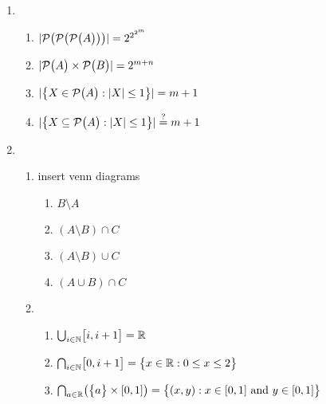 \begin{enumerate}
    \item 
    \begin{enumerate}[label=(\alph*), itemsep=10pt]
        \item $\lvert {\mathcal{P}\bigl( {\mathcal{P}\bigl( {\mathcal{P}\bigl( {A} \bigr)} \bigr)} \bigr)} \rvert = 2^{2^{2^m}}$
        \item $\lvert {\mathcal{P}\bigl( {A} \bigr)\times\mathcal{P}\bigl( {B} \bigr)} \rvert = 2^{m + n}$
        \item $\lvert {\bigl\{ {X \in \mathcal{P}\bigl( {A} \bigr) : \lvert {X} \rvert \leq 1} \bigr\}} \rvert = m + 1$
        \item $\lvert {\bigl\{ {X \subseteq \mathcal{P}\bigl( {A} \bigr) : \lvert {X} \rvert \leq 1} \bigr\}} \rvert \stackrel{?}{=} m + 1$ 
    \end{enumerate}

    \item
    \begin{enumerate}[label=(\alph*), itemsep=16pt]
        \item insert venn diagrams
        \begin{enumerate}[label=(\roman*), itemsep=10pt]
            \item $B \setminus A$
            \item $(A \setminus B) \cap C$
            \item $(A \setminus B) \cup C$
            \item $(A \cup B) \cap C$
        \end{enumerate}

        \item 
        \begin{enumerate}[label=(\roman*), itemsep=10pt]
            \item $\bigcup_{i \in \operatorname{\mathbb{N}}} \bigl[i,i+1\bigr] = \operatorname{\mathbb{R}}$
            \item $\bigcap_{i \in \operatorname{\mathbb{N}}} \bigl[0,i+1\bigr] = \bigl\{ { x \in \operatorname{\mathbb{R}} : 0 \le x \le 2 } \bigr\}$
            \item $\bigcap_{a \in \operatorname{\mathbb{R}}} \bigl(\bigl\{ {a} \bigr\} \times [0, 1]\bigr) = \bigl\{ { (x,y) : x \in [0,1] \text{ and } y \in [0,1] } \bigr\}$
        \end{enumerate}
    \end{enumerate}
\end{enumerate}
    

